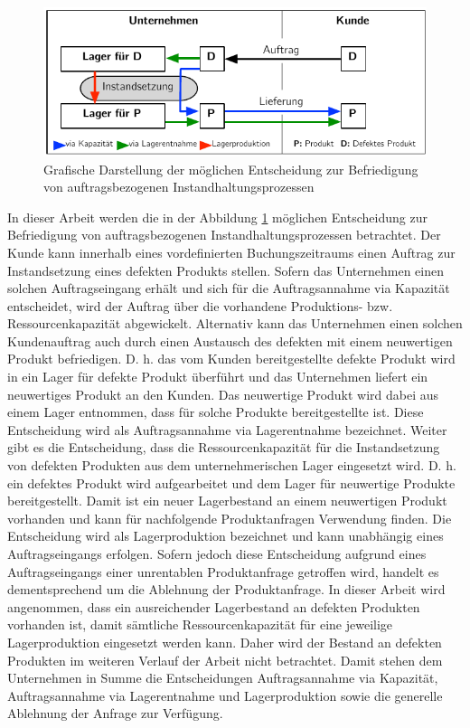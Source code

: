 \begin{figure}[h!]
  \begin{center}
    \includegraphics[width=120mm]{Bilder/Konzept.pdf}
    \caption{Grafische Darstellung der möglichen Entscheidung zur Befriedigung von auftragsbezogenen Instandhaltungsprozessen}  \label{Konzept}
  \end{center}
\end{figure}

In dieser Arbeit werden die in der Abbildung \ref{Konzept} möglichen Entscheidung zur Befriedigung von auftragsbezogenen Instandhaltungsprozessen betrachtet. Der Kunde kann innerhalb eines vordefinierten Buchungszeitraums einen Auftrag zur Instandsetzung eines defekten Produkts stellen. Sofern das Unternehmen einen solchen Auftragseingang erhält und sich für die \glqq Auftragsannahme via Kapazität{\grqq} entscheidet, wird der Auftrag über die vorhandene Produktions- bzw. Ressourcenkapazität abgewickelt. Alternativ kann das Unternehmen einen solchen Kundenauftrag auch durch einen Austausch des defekten mit einem neuwertigen Produkt befriedigen. D. h. das vom Kunden bereitgestellte defekte Produkt wird in ein Lager für defekte Produkt überführt und das Unternehmen liefert ein neuwertiges Produkt an den Kunden. Das neuwertige Produkt wird dabei aus einem Lager entnommen, dass für solche Produkte bereitgestellte ist. Diese Entscheidung wird als \glqq Auftragsannahme via Lagerentnahme{\grqq} bezeichnet. Weiter gibt es die Entscheidung, dass die Ressourcenkapazität für die Instandsetzung von defekten Produkten aus dem unternehmerischen Lager eingesetzt wird. D. h. ein defektes Produkt wird aufgearbeitet und dem Lager für neuwertige Produkte bereitgestellt. Damit ist ein neuer Lagerbestand an einem neuwertigen Produkt vorhanden und kann für nachfolgende Produktanfragen Verwendung finden. Die Entscheidung wird als \glqq Lagerproduktion{\grqq} bezeichnet und kann unabhängig eines Auftragseingangs erfolgen. Sofern jedoch diese Entscheidung aufgrund eines Auftragseingangs einer unrentablen Produktanfrage getroffen wird, handelt es dementsprechend um die Ablehnung der Produktanfrage. In dieser Arbeit wird angenommen, dass ein ausreichender Lagerbestand an defekten Produkten vorhanden ist, damit sämtliche Ressourcenkapazität für eine jeweilige Lagerproduktion eingesetzt werden kann. Daher wird der Bestand an defekten Produkten im weiteren Verlauf der Arbeit nicht betrachtet. Damit stehen dem Unternehmen in Summe die Entscheidungen \glqq Auftragsannahme via Kapazität{\grqq}, \glqq Auftragsannahme via Lagerentnahme{\grqq} und \glqq Lagerproduktion{\grqq} sowie die generelle \glqq Ablehnung der Anfrage{\grqq} zur Verfügung.

